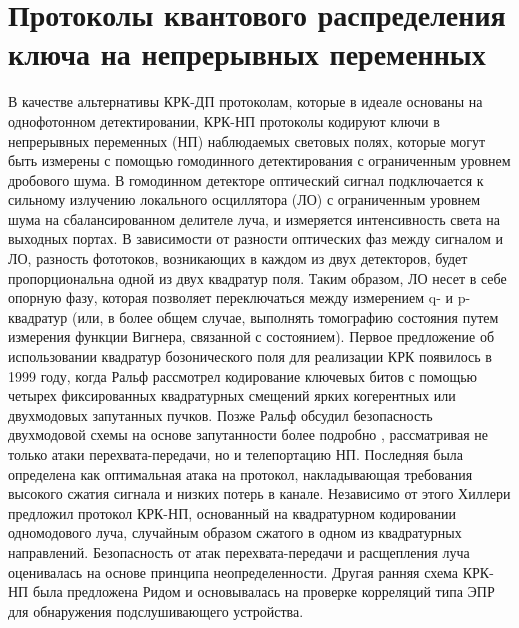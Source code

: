\section{Протоколы квантового распределения ключа на непрерывных переменных}\label{sec:ch1/CV-QKD review}
В качестве альтернативы КРК-ДП протоколам, которые в идеале основаны на однофотонном детектировании, КРК-НП \cite{braunstein2005} протоколы кодируют ключи в непрерывных переменных (НП) наблюдаемых световых полях, которые могут быть измерены с помощью гомодинного детектирования с ограниченным уровнем дробового шума. В гомодинном детекторе оптический сигнал подключается к сильному излучению локального осциллятора (ЛО) с ограниченным уровнем шума на сбалансированном делителе луча, и измеряется интенсивность света на выходных портах. В зависимости от разности оптических фаз между сигналом и ЛО, разность фототоков, возникающих в каждом из двух детекторов, будет пропорциональна одной из двух квадратур поля. Таким образом, ЛО несет в себе опорную фазу, которая позволяет переключаться между измерением q- и p-квадратур (или, в более общем случае, выполнять томографию состояния путем измерения функции Вигнера, связанной с состоянием).
Первое предложение об использовании квадратур бозонического поля для реализации КРК появилось в 1999 году, когда Ральф \cite{ralph1999} рассмотрел кодирование ключевых битов с помощью четырех фиксированных квадратурных смещений ярких когерентных или двухмодовых запутанных пучков. Позже Ральф обсудил безопасность двухмодовой схемы на основе запутанности более подробно \cite{ralph2000}, рассматривая не только атаки перехвата-передачи, но и телепортацию НП. Последняя была определена как оптимальная атака на протокол, накладывающая требования высокого сжатия сигнала и низких потерь в канале. Независимо от этого Хиллери \cite{hillery2000} предложил протокол КРК-НП, основанный на квадратурном кодировании одномодового луча, случайным образом сжатого в одном из квадратурных направлений. Безопасность от атак перехвата-передачи и расщепления луча оценивалась на основе принципа неопределенности. Другая ранняя схема КРК-НП была предложена Ридом \cite{reid2000} и основывалась на проверке корреляций типа ЭПР для обнаружения подслушивающего устройства.
